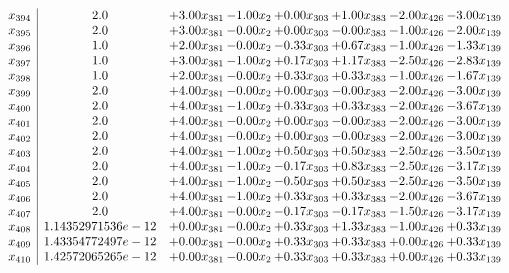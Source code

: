 \documentclass[8pt]{article}
\begin{document}
\[\begin{array}{c| c c@{\hskip 2pt} c@{\hskip 2pt} c@{\hskip 2pt} c@{\hskip 2pt} c@{\hskip 2pt} c@{\hskip 2pt} }
 x_{394}   &  2.0 & +  3.00 x_{381} & -1.00 x_{2} & +  0.00 x_{303} & +  1.00 x_{383} & -2.00 x_{426} & -3.00 x_{139}\\
 x_{395}   &  2.0 & +  3.00 x_{381} & -0.00 x_{2} & +  0.00 x_{303} & -0.00 x_{383} & -1.00 x_{426} & -2.00 x_{139}\\
 x_{396}   &  1.0 & +  2.00 x_{381} & -0.00 x_{2} & -0.33 x_{303} & +  0.67 x_{383} & -1.00 x_{426} & -1.33 x_{139}\\
 x_{397}   &  1.0 & +  3.00 x_{381} & -1.00 x_{2} & +  0.17 x_{303} & +  1.17 x_{383} & -2.50 x_{426} & -2.83 x_{139}\\
 x_{398}   &  1.0 & +  2.00 x_{381} & -0.00 x_{2} & +  0.33 x_{303} & +  0.33 x_{383} & -1.00 x_{426} & -1.67 x_{139}\\
 x_{399}   &  2.0 & +  4.00 x_{381} & -0.00 x_{2} & +  0.00 x_{303} & -0.00 x_{383} & -2.00 x_{426} & -3.00 x_{139}\\
 x_{400}   &  2.0 & +  4.00 x_{381} & -1.00 x_{2} & +  0.33 x_{303} & +  0.33 x_{383} & -2.00 x_{426} & -3.67 x_{139}\\
 x_{401}   &  2.0 & +  4.00 x_{381} & -0.00 x_{2} & +  0.00 x_{303} & -0.00 x_{383} & -2.00 x_{426} & -3.00 x_{139}\\
 x_{402}   &  2.0 & +  4.00 x_{381} & -0.00 x_{2} & +  0.00 x_{303} & -0.00 x_{383} & -2.00 x_{426} & -3.00 x_{139}\\
 x_{403}   &  2.0 & +  4.00 x_{381} & -1.00 x_{2} & +  0.50 x_{303} & +  0.50 x_{383} & -2.50 x_{426} & -3.50 x_{139}\\
 x_{404}   &  2.0 & +  4.00 x_{381} & -1.00 x_{2} & -0.17 x_{303} & +  0.83 x_{383} & -2.50 x_{426} & -3.17 x_{139}\\
 x_{405}   &  2.0 & +  4.00 x_{381} & -1.00 x_{2} & -0.50 x_{303} & +  0.50 x_{383} & -2.50 x_{426} & -3.50 x_{139}\\
 x_{406}   &  2.0 & +  4.00 x_{381} & -1.00 x_{2} & +  0.33 x_{303} & +  0.33 x_{383} & -2.00 x_{426} & -3.67 x_{139}\\
 x_{407}   &  2.0 & +  4.00 x_{381} & -0.00 x_{2} & -0.17 x_{303} & -0.17 x_{383} & -1.50 x_{426} & -3.17 x_{139}\\
 x_{408}   &  1.14352971536e-12 & +  0.00 x_{381} & -0.00 x_{2} & +  0.33 x_{303} & +  1.33 x_{383} & -1.00 x_{426} & +  0.33 x_{139}\\
 x_{409}   &  1.43354772497e-12 & +  0.00 x_{381} & -0.00 x_{2} & +  0.33 x_{303} & +  0.33 x_{383} & +  0.00 x_{426} & +  0.33 x_{139}\\
 x_{410}   &  1.42572065265e-12 & +  0.00 x_{381} & -0.00 x_{2} & +  0.33 x_{303} & +  0.33 x_{383} & +  0.00 x_{426} & +  0.33 x_{139}\\

\end{array}\]
\end{document}
